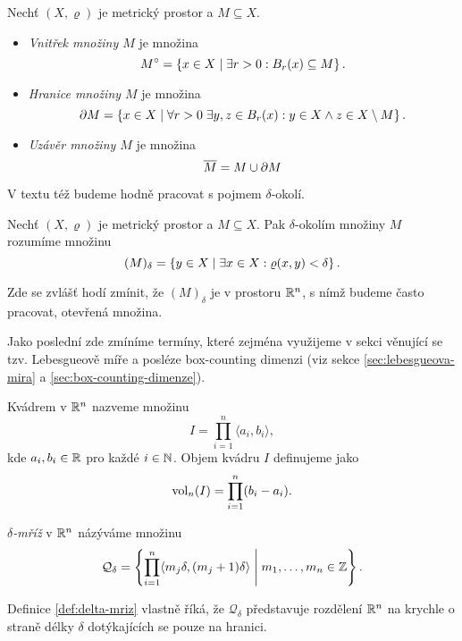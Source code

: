 \begin{definition}\label{def:vnitrek-hranice-uzaver}
    Nechť $(X,\varrho)$ je metrický prostor a $M\subseteq X$.
    \begin{itemize}
        \item \emph{Vnitřek množiny $M$} je množina
        \[M^\circ=\left\{x\in X\mid \exists r>0: B_r(x)\subseteq M\right\}.\]
        \item \emph{Hranice množiny $M$} je množina
        \[\partial M=\left\{x\in X\mid \forall r>0\;\exists y,z\in B_r(x): y\in X\land z\in X\setminus M\right\}.\]
        \item \emph{Uzávěr množiny $M$} je množina
        \[\overline{M}=M\cup\partial M\]
    \end{itemize}
\end{definition}
V textu též budeme hodně pracovat s pojmem $\delta$-okolí.
\begin{definition}\label{def:delta-okoli}
    Nechť $(X,\varrho)$ je metrický prostor a $M\subseteq X$. Pak $\delta$-okolím množiny $M$ rozumíme množinu
    \[(M)_\delta=\left\{y\in X\mid \exists x\in X: \varrho(x,y)<\delta\right\}.\]
\end{definition}
Zde se zvlášť hodí zmínit, že $(M)_\delta$ je v prostoru $\mathbb{R}^n$, s nímž budeme často pracovat, otevřená množina.

Jako poslední zde zmíníme termíny, které zejména využijeme v sekci věnující se tzv. Lebesgueově míře a posléze box-counting dimenzi (viz sekce \ref{sec:lebesgueova-mira} a \ref{sec:box-counting-dimenze}).
\begin{definition}[Kvádr]\label{def:kvadr}
    Kvádrem v $\mathbb{R}^n$ nazveme množinu
    \[I=\prod_{i=1}^{n}\langle a_i,b_i\rangle,\]
    kde $a_i,b_i\in\mathbb{R}$ pro každé $i\in\mathbb{N}$. Objem kvádru $I$ definujeme jako
    \[\operatorname{vol}_n(I)=\prod_{i=1}^{n}(b_i-a_i).\]
\end{definition}
\begin{definition}\label{def:delta-mriz}
    \emph{$\delta$-mříž} v $\mathbb{R}^n$ názýváme množinu
    \[\mathcal{Q}_\delta=\left\{\prod_{i=1}^{n}\langle m_j\delta,(m_j+1)\delta\rangle\;\middle|\;m_1,\ldots,m_n\in\mathbb{Z}\right\}.\]
\end{definition}
Definice \ref{def:delta-mriz} vlastně říká, že $\mathcal{Q}_\delta$ představuje rozdělení $\mathbb{R}^n$ na krychle o straně délky $\delta$ dotýkajících se pouze na hranici.

